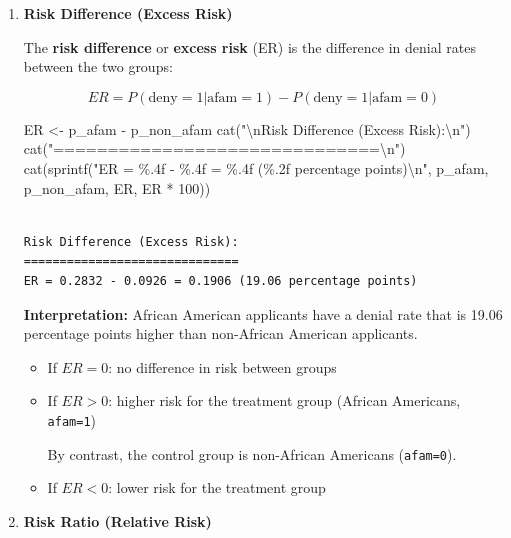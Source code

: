 \documentclass[
  12pt,
  letterpaper,
]{scrbook}
\newenvironment{Shaded}{\begin{snugshade}}{\end{snugshade}}
\newcommand{\DecValTok}[1]{\textcolor[rgb]{0.68,0.00,0.00}{#1}}
\newcommand{\FunctionTok}[1]{\textcolor[rgb]{0.28,0.35,0.67}{#1}}
\newcommand{\NormalTok}[1]{\textcolor[rgb]{0.00,0.23,0.31}{#1}}
\newcommand{\OtherTok}[1]{\textcolor[rgb]{0.00,0.23,0.31}{#1}}
\newcommand{\SpecialCharTok}[1]{\textcolor[rgb]{0.37,0.37,0.37}{#1}}
\newcommand{\StringTok}[1]{\textcolor[rgb]{0.13,0.47,0.30}{#1}}
\theoremstyle{definition}
\theoremstyle{plain}
\theoremstyle{remark}
\begin{document}
\begin{enumerate}
\def\labelenumi{\arabic{enumi}.}
\item
  \textbf{Risk Difference (Excess Risk)}

  The \textbf{risk difference} or \textbf{excess risk} (ER) is the
  difference in denial rates between the two groups:

  \[
  ER = P(\text{deny}=1|\text{afam}=1) - P(\text{deny}=1|\text{afam}=0)
  \]

\begin{Shaded}
\begin{Highlighting}[]
\NormalTok{ER }\OtherTok{\textless{}{-}}\NormalTok{ p\_afam }\SpecialCharTok{{-}}\NormalTok{ p\_non\_afam}
\FunctionTok{cat}\NormalTok{(}\StringTok{"}\SpecialCharTok{\textbackslash{}n}\StringTok{Risk Difference (Excess Risk):}\SpecialCharTok{\textbackslash{}n}\StringTok{"}\NormalTok{)}
\FunctionTok{cat}\NormalTok{(}\StringTok{"==============================}\SpecialCharTok{\textbackslash{}n}\StringTok{"}\NormalTok{)}
\FunctionTok{cat}\NormalTok{(}\FunctionTok{sprintf}\NormalTok{(}\StringTok{"ER = \%.4f {-} \%.4f = \%.4f (\%.2f percentage points)}\SpecialCharTok{\textbackslash{}n}\StringTok{"}\NormalTok{, p\_afam, p\_non\_afam, ER, ER }\SpecialCharTok{*} \DecValTok{100}\NormalTok{))}
\end{Highlighting}
\end{Shaded}

\begin{verbatim}

Risk Difference (Excess Risk):
==============================
ER = 0.2832 - 0.0926 = 0.1906 (19.06 percentage points)
\end{verbatim}

  \textbf{Interpretation:} African American applicants have a denial
  rate that is 19.06 percentage points higher than non-African American
  applicants.

  \begin{itemize}
  \item
    If \(ER = 0\): no difference in risk between groups
  \item
    If \(ER > 0\): higher risk for the {treatment group} (African
    Americans, \texttt{afam=1})

    By contrast, the {control group} is non-African Americans
    (\texttt{afam=0}).
  \item
    If \(ER < 0\): lower risk for the treatment group
  \end{itemize}
\item
  \textbf{Risk Ratio (Relative Risk)}


\end{enumerate}
\end{document}
